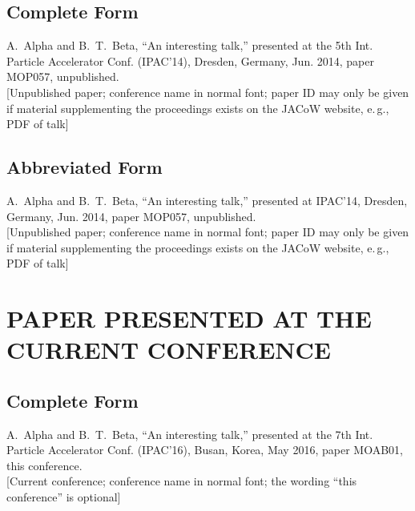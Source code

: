 \documentclass[letterpaper,  %
              ]{jacow-2_3}   %
\begin{document}
{{\subsection{Complete Form}

\begin{thebibliography}{9} %
\setcounter{enumi}{3}
	A.~Alpha and B.~T.~Beta, 
	“An interesting talk,”
	presented at the 5th Int. Particle Accelerator Conf. (IPAC’14), 
	Dresden, Germany, Jun. 2014, paper MOP057, unpublished.\\
	\textcolor{jred}{[Unpublished paper; conference name in normal font; paper
	ID may only be given if material supplementing the proceedings
	exists on the JACoW website, e.\,g., PDF of talk]}
\end{thebibliography}

\subsection{Abbreviated Form}

\begin{thebibliography}{9} %
\setcounter{enumi}{3}
	A.~Alpha and B.~T.~Beta, 
	“An interesting talk,”
	presented at IPAC’14, 
	Dresden, Germany, Jun. 2014, paper MOP057, unpublished.\\
	\textcolor{jred}{[Unpublished paper; conference name in normal font; paper
	ID may only be given if material supplementing the proceedings
	exists on the JACoW website, e.\,g., PDF of talk]}
\end{thebibliography}


\section{PAPER PRESENTED AT THE CURRENT CONFERENCE}

\subsection{Complete Form}

\begin{thebibliography}{9} %
\setcounter{enumi}{4}
	A.~Alpha and B.~T.~Beta, 
	“An interesting talk,”
	presented at the 7th Int. Particle Accelerator Conf. (IPAC’16), 
	Busan, Korea, May 2016, 
	paper MOAB01, this conference.\\
	\textcolor{jgrepc}{[Current conference; conference name in normal font; the
			           wording “this conference” is optional]}
\end{thebibliography}

}}
\end{document}
